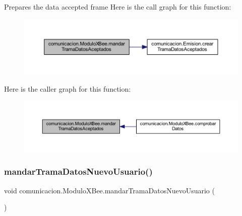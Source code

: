 Prepares the data accepted frame Here is the call graph for this function\+:
\nopagebreak
\begin{figure}[H]
\begin{center}
\leavevmode
\includegraphics[width=350pt]{classcomunicacion_1_1_modulo_x_bee_a60d0556ad61da3b8f66d192779c70bd7_cgraph}
\end{center}
\end{figure}
Here is the caller graph for this function\+:
\nopagebreak
\begin{figure}[H]
\begin{center}
\leavevmode
\includegraphics[width=350pt]{classcomunicacion_1_1_modulo_x_bee_a60d0556ad61da3b8f66d192779c70bd7_icgraph}
\end{center}
\end{figure}
\mbox{\label{classcomunicacion_1_1_modulo_x_bee_aecb573d973ba1e5e24a2c2cc5d1541f6}} 
\subsubsection{\texorpdfstring{mandar\+Trama\+Datos\+Nuevo\+Usuario()}{mandarTramaDatosNuevoUsuario()}}
{\footnotesize\ttfamily void comunicacion.\+Modulo\+X\+Bee.\+mandar\+Trama\+Datos\+Nuevo\+Usuario (\begin{DoxyParamCaption}{ }\end{DoxyParamCaption})}


